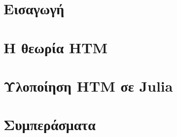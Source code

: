 \documentclass[a4paper,11pt,twoside]{report}
\title{\titlestring}
\author{\authorstring}
\date{24 Ιουνίου 2019}
\begin{document}


\clearpage
\newpage
\thispagestyle{empty}
\mbox{}

\tableofcontents{}
\listoffigures

\chapter{Εισαγωγή}


\chapter{Η θεωρία HTM}


\chapter{Υλοποίηση HTM σε Julia} \label{impl}




\chapter{Συμπεράσματα}


\printbibliography
\end{document}
